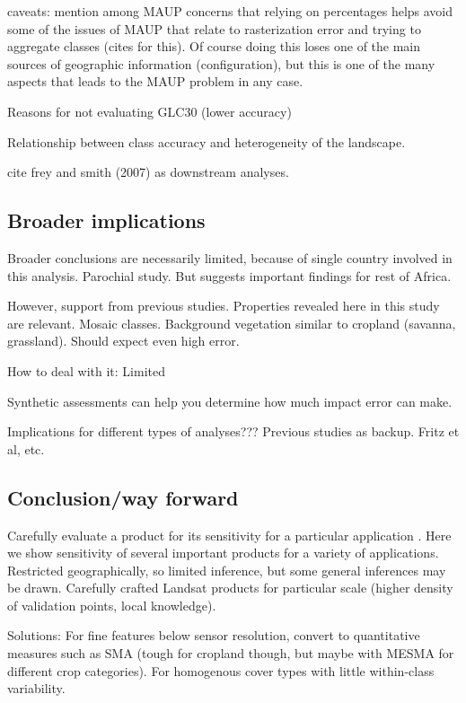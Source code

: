 \documentclass[a4paper]{article}
\begin{document}
caveats: mention among MAUP concerns that relying on percentages helps avoid some of the issues of MAUP that relate to rasterization error and trying to aggregate classes (cites for this). Of course doing this loses one of the main sources of geographic information (configuration), but this is one of the many aspects that leads to the MAUP problem in any case.  

Reasons for not evaluating GLC30 (lower accuracy)

\citep{verburg_challenges_2011} Relationship between class accuracy and heterogeneity of the landscape. 

cite frey and smith (2007) as downstream analyses. 

\subsection*{Broader implications}

Broader conclusions are necessarily limited, because of single country involved in this analysis. 
Parochial study. But suggests important findings for rest of Africa. 

However, support from previous studies.
Properties revealed here in this study are relevant.  Mosaic classes.  Background vegetation similar to cropland (savanna, grassland). Should expect even high error. 

How to deal with it: Limited

Synthetic assessments can help you determine how much impact error can make.

Implications for different types of analyses???
Previous studies as backup. Fritz et al, etc. 
  
\subsection*{Conclusion/way forward}

Carefully evaluate a product for its sensitivity for a particular application \citep{fritz_highlighting_2011}. Here we show sensitivity of several important products for a variety of applications.  Restricted geographically, so limited inference, but some general inferences may be drawn. Carefully crafted Landsat products for particular scale (higher density of validation points, local knowledge). 

Solutions: For fine features below sensor resolution, convert to quantitative measures such as SMA (tough for cropland though, but maybe with MESMA for different crop categories).  For homogenous cover types with little within-class variability. 
\end{document}
